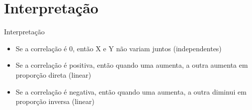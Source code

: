 \documentclass{beamer}
\begin{document}

    

    


\section{Interpretação}

\begin{frame}{Interpretação}
  \begin{itemize}
  \item Se a correlação é 0, então X e Y não variam juntos (independentes)
  \item Se a correlação é positiva, então quando uma aumenta, a outra
    aumenta em proporção direta (linear)
  \item Se a correlação é negativa, então quando uma aumenta, a outra
    diminui em proporção inversa (linear)
  \end{itemize}
\end{frame}
\end{document}

